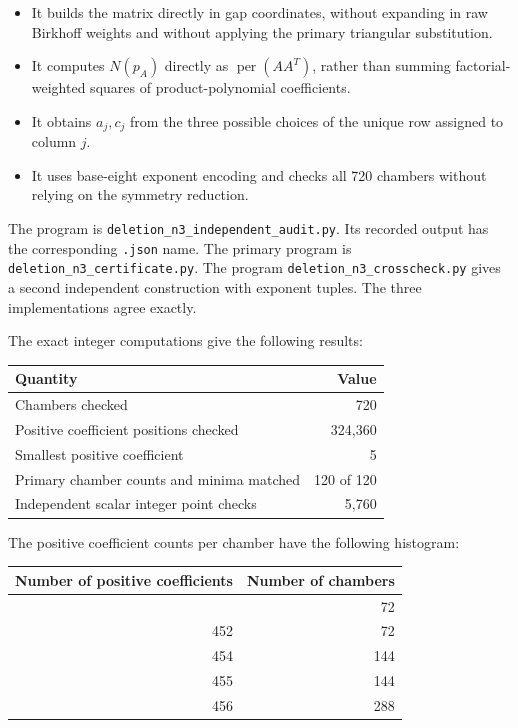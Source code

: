 \documentclass[11pt,a4paper]{article}
\providecommand{\tightlist}{\setlength{\itemsep}{0pt}\setlength{\parskip}{0pt}}
\theoremstyle{definition}
\theoremstyle{remark}
\begin{document}
\begin{itemize}
\tightlist
\item
  It builds the matrix directly in gap coordinates, without expanding in
  raw Birkhoff weights and without applying the primary triangular
  substitution.
\item
  It computes \(N(p_A)\) directly as \(\operatorname{per}(AA^T)\),
  rather than summing factorial-weighted squares of product-polynomial
  coefficients.
\item
  It obtains \(a_j,c_j\) from the three possible choices of the unique
  row assigned to column \(j\).
\item
  It uses base-eight exponent encoding and checks all 720 chambers
  without relying on the symmetry reduction.
\end{itemize}

The program is \nolinkurl{deletion_n3_independent_audit.py}. Its
recorded output has the corresponding \texttt{.json} name. The primary
program is \nolinkurl{deletion_n3_certificate.py}.
The program \nolinkurl{deletion_n3_crosscheck.py} gives a second independent
construction with exponent tuples. The three implementations agree exactly.

The exact integer computations give the following results:

{\def\LTcaptype{} %
\begin{longtable}[]{@{}lr@{}}
\toprule\noalign{}
Quantity & Value \\
\midrule\noalign{}
\endhead
\bottomrule\noalign{}
\endlastfoot
Chambers checked & 720 \\
Positive coefficient positions checked & 324,360 \\
Smallest positive coefficient & 5 \\
Primary chamber counts and minima matched & 120 of 120 \\
Independent scalar integer point checks & 5,760 \\
\end{longtable}
}

The positive coefficient counts per chamber have the following
histogram:

{\def\LTcaptype{} %
\begin{longtable}[]{@{}rr@{}}
\toprule\noalign{}
Number of positive coefficients & Number of chambers \\
\midrule\noalign{}
\endhead
\bottomrule\noalign{}
\endlastfoot
411 & 72 \\
452 & 72 \\
454 & 144 \\
455 & 144 \\
456 & 288 \\
\end{longtable}
}
\end{document}
